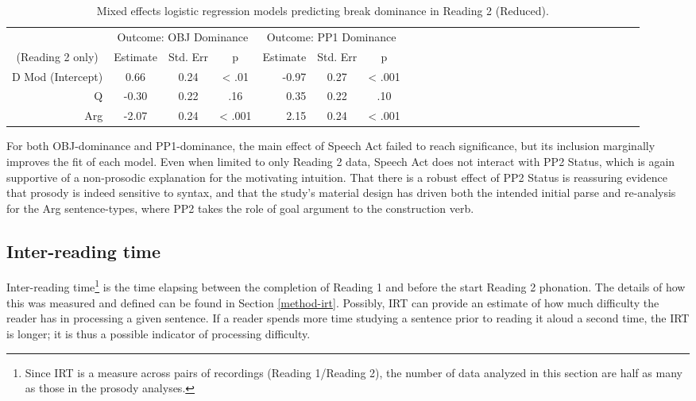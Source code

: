 \documentclass[11pt,oneside]{book}
\let\rmarkdownfootnote\footnote%
\def\footnote{\protect\rmarkdownfootnote}
\begin{document}
\begin{table}[!h]

\caption{\label{tab:r2dom}Mixed effects logistic regression models predicting break dominance in Reading 2 (Reduced).}
\centering
\begin{tabular}{rcccrcccrcccrcccrcccrcccrccc}
\toprule
\multicolumn{1}{c}{ } & \multicolumn{3}{c}{Outcome: OBJ Dominance} & \multicolumn{3}{c}{Outcome: PP1 Dominance} \\
\cmidrule(l{3pt}r{3pt}){2-4} \cmidrule(l{3pt}r{3pt}){5-7}
\multicolumn{1}{c}{(Reading 2 only)} & \multicolumn{1}{c}{Estimate} & \multicolumn{1}{c}{Std. Err} & \multicolumn{1}{c}{p} & \multicolumn{1}{c}{Estimate} & \multicolumn{1}{c}{Std. Err} & \multicolumn{1}{c}{p}\\
\midrule
D Mod (Intercept) & 0.66 & 0.24 & < .01 & -0.97 & 0.27 & < .001\\
Q & -0.30 & 0.22 & .16 & 0.35 & 0.22 & .10\\
Arg & -2.07 & 0.24 & < .001 & 2.15 & 0.24 & < .001\\
\bottomrule
\end{tabular}
\end{table}

For both OBJ-dominance and PP1-dominance, the main effect of Speech Act failed to reach significance, but its inclusion marginally improves the fit of each model. Even when limited to only Reading 2 data, Speech Act does not interact with PP2 Status, which is again supportive of a non-prosodic explanation for the motivating intuition. That there is a robust effect of PP2 Status is reassuring evidence that prosody is indeed sensitive to syntax, and that the study's material design has driven both the intended initial parse and re-analysis for the Arg sentence-types, where PP2 takes the role of goal argument to the construction verb.

\hypertarget{irt}{%
\subsection{Inter-reading time}\label{irt}}

Inter-reading time\footnote{Since IRT is a measure across pairs of recordings (Reading 1/Reading 2), the number of data analyzed in this section are half as many as those in the prosody analyses.} is the time elapsing between the completion of Reading 1 and before the start Reading 2 phonation. The details of how this was measured and defined can be found in Section \ref{method-irt}. Possibly, IRT can provide an estimate of how much difficulty the reader has in processing a given sentence. If a reader spends more time studying a sentence prior to reading it aloud a second time, the IRT is longer; it is thus a possible indicator of processing difficulty.
\end{document}
